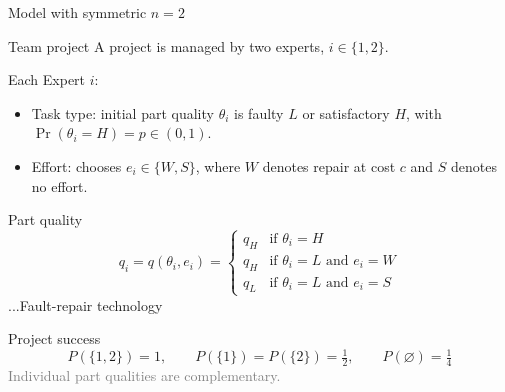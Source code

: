 \documentclass[10pt,aspectratio=169, compressed]{beamer}
\begin{document}
\begin{frame}
\centering
\vfill
{\large Model with symmetric $n=2$}
\vfill
\end{frame}




\begin{frame}{Team project}
A project is managed by two experts, $i \in  \{1,2\}$.
\medskip

Each Expert $i$:

\begin{itemize}
\item {Task type:}  initial part quality $\theta_i$ is faulty $L$ or satisfactory $H$, with $\Pr(\theta_i = H) = p\in (0,1)$.
\item {Effort:} chooses $e_i \in \{W,S\}$, where $W$ denotes repair at cost $c$ and $S$ denotes no effort.
\end{itemize}

\medskip

{Part quality}
$$q_i = q(\theta_i, e_i) = \begin{cases} q_H & \text{if } \theta_i = H \\
q_H & \text{if } \theta_i = L \text{ and } e_i = W \\
q_L & \text{if } \theta_i = L \text{ and } e_i = S
\end{cases}$$
\hfill ...Fault-repair technology
\smallskip

{Project success}
$$P(\{1,2\}) = 1, \qquad P(\{1\}) = P(\{2\}) = \tfrac{1}{2}, \qquad P(\varnothing) = \tfrac{1}{4}$$
\textcolor{gray}{\small Individual part qualities are complementary.}
\end{frame}






\end{document}
